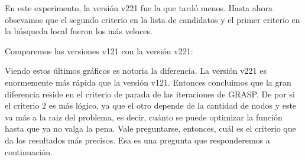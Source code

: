 En este experimento, la versión v221 fue la que tardó menos.
Hasta ahora obsevamos que el segundo criterio en la lista de candidatos y el primer criterio en la búsqueda local fueron los más veloces.

\medskip

Comparemos las versiones v121 con la versión v221:

\begin{center}



\end{center}

Viendo estos últimos gráficos es notoria la diferencia. La versión v221 es enormemente más rápida que la versión v121.
Entonces concluimos que la gran diferencia reside en el criterio de parada de las iteraciones de GRASP.
De por si el criterio 2 es más lógico, ya que el otro depende de la cantidad de nodos y este va más a la raiz del problema, es decir, cuánto se puede optimizar la función hasta que ya no valga la pena.
Vale preguntarse, entonces, cuál es el criterio que da los resultados más precisos.
Esa es una pregunta que responderemos a continuación.

